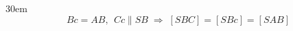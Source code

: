\documentclass[border=4pt]{standalone}
\begin{document}
\begin{varwidth}{30em}
\large
\[ Bc = AB,\ \ Cc \parallel SB \;\Rightarrow\; [SBC] = [SBc] = [SAB] \]

\end{varwidth}
\end{document}
